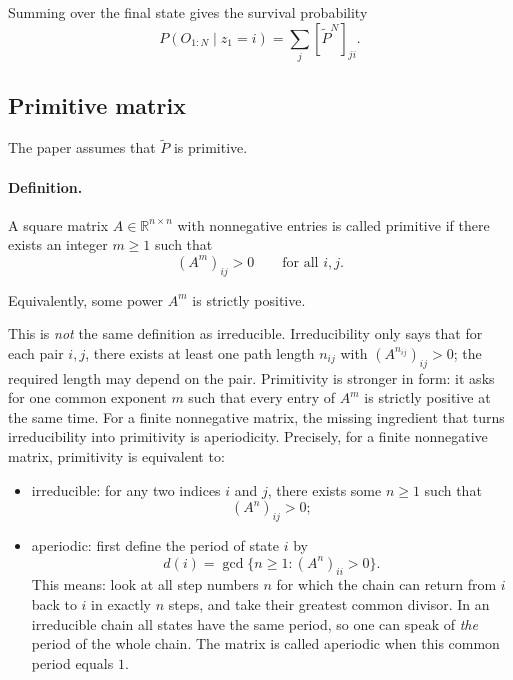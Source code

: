 \documentclass[11pt]{article}
\begin{document}
Summing over the final state gives the survival probability
\begin{equation}
    P(O_{1:N}\mid z_1=i)
    =
    \sum_j [\widetilde{P}^{N}]_{ji}.
\end{equation}

\subsection*{Primitive matrix}

The paper assumes that \(\widetilde{P}\) is primitive.

\paragraph{Definition.}
A square matrix \(A\in\mathbb{R}^{n\times n}\) with nonnegative entries is called primitive if
there exists an integer \(m\ge 1\) such that
\begin{equation}
    (A^m)_{ij}>0
    \qquad \text{for all } i,j.
\end{equation}

Equivalently, some power \(A^m\) is strictly positive.

This is \emph{not} the same definition as irreducible. Irreducibility only says that for each
pair \(i,j\), there exists at least one path length \(n_{ij}\) with
\((A^{n_{ij}})_{ij}>0\); the required length may depend on the pair. Primitivity is stronger in
form: it asks for one common exponent \(m\) such that every entry of \(A^m\) is strictly
positive at the same time. For a finite nonnegative matrix, the missing ingredient that turns
irreducibility into primitivity is aperiodicity. Precisely, for a finite nonnegative matrix,
primitivity is equivalent to:
\begin{itemize}
    \item irreducible: for any two indices \(i\) and \(j\), there exists some \(n\ge 1\) such
    that
    \begin{equation}
        (A^n)_{ij}>0;
    \end{equation}
    \item aperiodic: first define the period of state \(i\) by
    \begin{equation}
        d(i)=\gcd\{n\ge 1:(A^n)_{ii}>0\}.
    \end{equation}
    This means: look at all step numbers \(n\) for which the chain can return from \(i\) back
    to \(i\) in exactly \(n\) steps, and take their greatest common divisor. In an irreducible
    chain all states have the same period, so one can speak of \emph{the} period of the whole
    chain. The matrix is called aperiodic when this common period equals \(1\).
\end{itemize}
\end{document}
